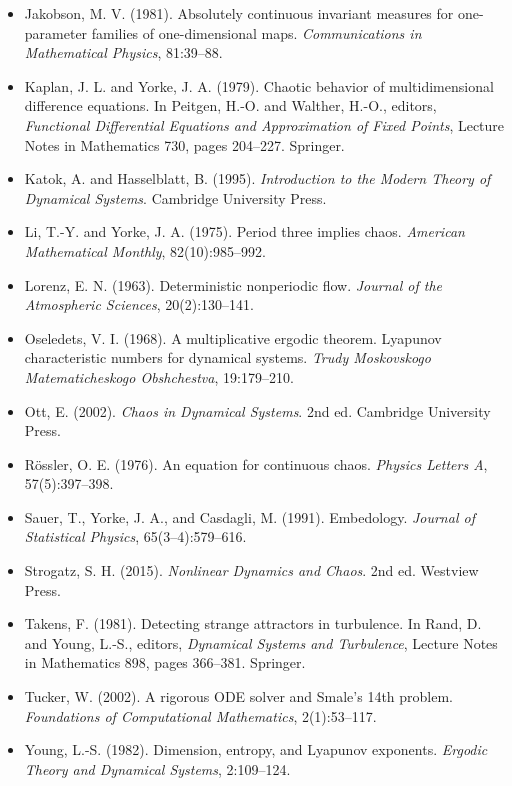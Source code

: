 \begin{itemize}[nosep]
  \item Jakobson, M. V. (1981). Absolutely continuous invariant measures for one-parameter families of one-dimensional maps. \textit{Communications in Mathematical Physics}, 81:39--88.

  \item Kaplan, J. L. and Yorke, J. A. (1979). Chaotic behavior of multidimensional difference equations. In Peitgen, H.-O. and Walther, H.-O., editors, \textit{Functional Differential Equations and Approximation of Fixed Points}, Lecture Notes in Mathematics 730, pages 204--227. Springer.

  \item Katok, A. and Hasselblatt, B. (1995). \textit{Introduction to the Modern Theory of Dynamical Systems}. Cambridge University Press.

  \item Li, T.-Y. and Yorke, J. A. (1975). Period three implies chaos. \textit{American Mathematical Monthly}, 82(10):985--992.

  \item Lorenz, E. N. (1963). Deterministic nonperiodic flow. \textit{Journal of the Atmospheric Sciences}, 20(2):130--141.

  \item Oseledets, V. I. (1968). A multiplicative ergodic theorem. Lyapunov characteristic numbers for dynamical systems. \textit{Trudy Moskovskogo Matematicheskogo Obshchestva}, 19:179--210.

  \item Ott, E. (2002). \textit{Chaos in Dynamical Systems}. 2nd ed. Cambridge University Press.

  \item Rössler, O. E. (1976). An equation for continuous chaos. \textit{Physics Letters A}, 57(5):397--398.

  \item Sauer, T., Yorke, J. A., and Casdagli, M. (1991). Embedology. \textit{Journal of Statistical Physics}, 65(3--4):579--616.

  \item Strogatz, S. H. (2015). \textit{Nonlinear Dynamics and Chaos}. 2nd ed. Westview Press.

  \item Takens, F. (1981). Detecting strange attractors in turbulence. In Rand, D. and Young, L.-S., editors, \textit{Dynamical Systems and Turbulence}, Lecture Notes in Mathematics 898, pages 366--381. Springer.

  \item Tucker, W. (2002). A rigorous ODE solver and Smale's 14th problem. \textit{Foundations of Computational Mathematics}, 2(1):53--117.

  \item Young, L.-S. (1982). Dimension, entropy, and Lyapunov exponents. \textit{Ergodic Theory and Dynamical Systems}, 2:109--124.


\bigskip

\end{itemize}

